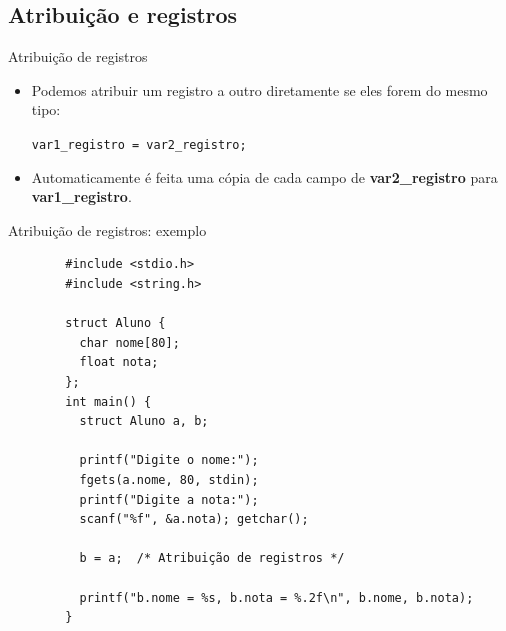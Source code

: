 \documentclass[handout]{beamer}
\newcommand{\cod}[1]{\texttt{#1}}
\begin{document}
\subsection{Atribuição e registros}

\begin{frame}[fragile]{Atribuição de registros}

    \begin{itemize}
        \item Podemos atribuir um registro a outro diretamente se eles forem do mesmo tipo:

        \begin{center}
            \cod{var1_registro = var2_registro;}
        \end{center}

        \item Automaticamente é feita uma cópia de cada campo de
        \textbf{var2\_registro} para \textbf{var1\_registro}.

    \end{itemize}

\end{frame}

\begin{frame}[fragile]{Atribuição de registros: exemplo}

    \begin{verbatim}
        #include <stdio.h>
        #include <string.h>

        struct Aluno {
          char nome[80];
          float nota;
        };
        int main() {
          struct Aluno a, b;

          printf("Digite o nome:");
          fgets(a.nome, 80, stdin);
          printf("Digite a nota:");
          scanf("%f", &a.nota); getchar();

          b = a;  /* Atribuição de registros */

          printf("b.nome = %s, b.nota = %.2f\n", b.nome, b.nota);
        }
    \end{verbatim}

\end{frame}

\end{document}
